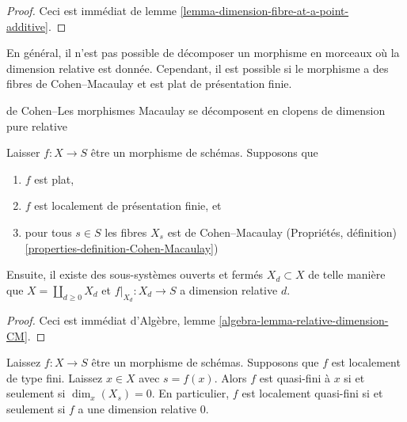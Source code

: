 \begin{proof}
Ceci est immédiat de lemme \ref{lemma-dimension-fibre-at-a-point-additive}.
\end{proof}

\noindent
En général, il n'est pas possible de décomposer un morphisme en morceaux où la dimension relative est donnée. Cependant, il est possible si le morphisme a des fibres de Cohen--Macaulay et est plat de présentation finie.

\begin{lemma}

\label{lemma-flat-finite-presentation-CM-fibres-relative-dimension}

\begin{slogan}

de Cohen--Les morphismes Macaulay se décomposent en clopens de dimension pure relative

\end{slogan}

Laisser $f : X \to S$ être un morphisme de schémas. Supposons que

\begin{enumerate}

\item  $f$ est plat,
\item  $f$ est localement de présentation finie, et
\item pour tous $s \in S$ les fibres $X_s$ est de Cohen--Macaulay (Propriétés, définition) \ref{properties-definition-Cohen-Macaulay})

\end{enumerate}

Ensuite, il existe des sous-systèmes ouverts et fermés $X_d \subset X$
de telle manière que $X = \coprod_{d \geq 0} X_d$ et $f|_{X_d} : X_d \to S$
a dimension relative $d$.

\end{lemma}

\begin{proof}
Ceci est immédiat d'Algèbre, lemme \ref{algebra-lemma-relative-dimension-CM}.
\end{proof}

\begin{lemma}

\label{lemma-locally-quasi-finite-rel-dimension-0}
Laissez $f : X \to S$ être un morphisme de schémas. Supposons que $f$ est localement de type fini. Laissez $x \in X$ avec $s = f(x)$. Alors $f$ est quasi-fini à $x$ si et seulement si $\dim_x(X_s) = 0$. En particulier, $f$ est localement quasi-fini si et seulement si $f$ a une dimension relative $0$.
\end{lemma}

